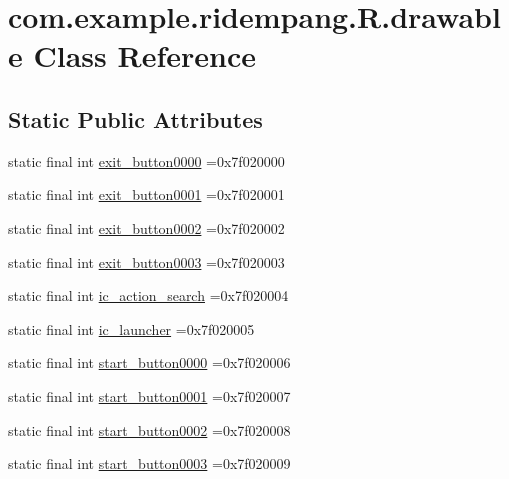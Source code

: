 \hypertarget{classcom_1_1example_1_1ridempang_1_1_r_1_1drawable}{\section{com.\-example.\-ridempang.\-R.\-drawable Class Reference}
\label{classcom_1_1example_1_1ridempang_1_1_r_1_1drawable}
}
\subsection*{Static Public Attributes}
\begin{DoxyCompactItemize}
\item 
static final int \hyperlink{classcom_1_1example_1_1ridempang_1_1_r_1_1drawable_a9a2fe33339f911270f367dc62585ba2a}{exit\-\_\-button0000} =0x7f020000
\item 
static final int \hyperlink{classcom_1_1example_1_1ridempang_1_1_r_1_1drawable_a2e62b83d6632bfb0298a83f3be4a92cb}{exit\-\_\-button0001} =0x7f020001
\item 
static final int \hyperlink{classcom_1_1example_1_1ridempang_1_1_r_1_1drawable_a3b61f9dadd44a618935f894471398052}{exit\-\_\-button0002} =0x7f020002
\item 
static final int \hyperlink{classcom_1_1example_1_1ridempang_1_1_r_1_1drawable_ae3201e7aa951d02ed05a15d7e141fa47}{exit\-\_\-button0003} =0x7f020003
\item 
static final int \hyperlink{classcom_1_1example_1_1ridempang_1_1_r_1_1drawable_ac0928c652f560f42b9aaff087e71c528}{ic\-\_\-action\-\_\-search} =0x7f020004
\item 
static final int \hyperlink{classcom_1_1example_1_1ridempang_1_1_r_1_1drawable_ad36764a70a85092d2838e00a5b8eb71e}{ic\-\_\-launcher} =0x7f020005
\item 
static final int \hyperlink{classcom_1_1example_1_1ridempang_1_1_r_1_1drawable_aac533a3d2fcf50231495fe1ea5cb5c90}{start\-\_\-button0000} =0x7f020006
\item 
static final int \hyperlink{classcom_1_1example_1_1ridempang_1_1_r_1_1drawable_aa4ab2e0df25efd870529966d6c8ebb07}{start\-\_\-button0001} =0x7f020007
\item 
static final int \hyperlink{classcom_1_1example_1_1ridempang_1_1_r_1_1drawable_ab9a46e21a1ea589f648062624d158dbc}{start\-\_\-button0002} =0x7f020008
\item 
static final int \hyperlink{classcom_1_1example_1_1ridempang_1_1_r_1_1drawable_aac61d562bbbab8bbe28207ac89bc5b25}{start\-\_\-button0003} =0x7f020009
\end{DoxyCompactItemize}


